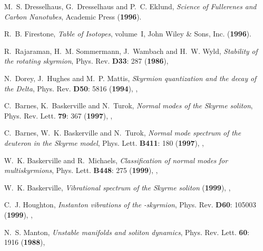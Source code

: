 \documentclass[a4paper,12pt]{article}
\begin{document}
\begin{small}
\begin{thebibliography}{10}
M.~S. Dresselhaus, G.~Dresselhaus and P.~C. Eklund, {\em Science of Fullerenes
  and Carbon Nanotubes\/}, Academic Press
 ({\bf 1996}).

R.~B. Firestone, {\em Table of Isotopes\/}, volume~I, John Wiley \& Sons, Inc.
 ({\bf 1996}).

R.~Rajaraman, H.~M. Sommermann, J.~Wambach and H.~W. Wyld, {\em Stability of
  the rotating skyrmion\/}, Phys. Rev. {\bf D33}: 287 ({\bf 1986}),

N.~Dorey, J.~Hughes and M.~P. Mattis, {\em Skyrmion quantization and the decay
  of the {D}elta\/}, Phys. Rev. {\bf D50}: 5816 ({\bf 1994}),
  {},

C.~Barnes, K.~Baskerville and N.~Turok, {\em Normal modes of the \coordHE{}
  {S}kyrme soliton\/}, Phys. Rev. Lett. {\bf 79}: 367 ({\bf 1997}),
  {},

C.~Barnes, W.~K. Baskerville and N.~Turok, {\em Normal mode spectrum of the
  deuteron in the {S}kyrme model\/}, Phys. Lett. {\bf B411}: 180 ({\bf 1997}),
  {},

W.~K. Baskerville and R.~Michaels, {\em Classification of normal modes for
  multiskyrmions\/}, Phys. Lett. {\bf B448}: 275 ({\bf 1999}),
  {},

W.~K. Baskerville, {\em Vibrational spectrum of the \coordHE{} {S}kyrme
  soliton\/}  ({\bf 1999}), {},

C.~J. Houghton, {\em Instanton vibrations of the \coordHE{}-skyrmion\/}, Phys. Rev.
  {\bf D60}: 105003 ({\bf 1999}), {},

N.~S. Manton, {\em Unstable manifolds and soliton dynamics\/}, Phys. Rev. Lett.
  {\bf 60}: 1916 ({\bf 1988}),

\end{thebibliography}


\label{lastref}
\end{small}
\end{document}
